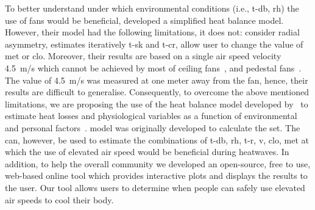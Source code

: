 To better understand under which environmental conditions (i.e., \ac{t-db}, \ac{rh}) the use of fans would be beneficial,  developed a simplified heat balance model.
However, their model had the following limitations, it does not: consider radial asymmetry, estimates iteratively \ac{t-sk} and \ac{t-cr}, allow user to change the value of \ac{met} or \ac{clo}.
Moreover, their results are based on a single air speed velocity 4.5~m/s which cannot be achieved by most of ceiling fans~\cite{Raftery2019}, and pedestal fans~\cite{Yang2015a}.
The value of 4.5~m/s was measured at one meter away from the fan, hence, their results are difficult to generalise.
Consequently, to overcome the above mentioned limitations, we are proposing the use of the heat balance model developed by~ to estimate heat losses and physiological variables as a function of environmental and personal factors~\cite{Gagge1986}.
 model was originally developed to calculate the \ac{set}.
The  can, however, be used to estimate the combinations of \ac{t-db}, \ac{rh}, \ac{t-r}, \ac{v}, \ac{clo}, \ac{met} at which the use of elevated air speed would be beneficial during heatwaves.
In addition, to help the overall community we developed an open-source, free to use, web-based online tool which provides interactive plots and displays the results to the user.
Our tool allows users to determine when people can safely use elevated air speeds to cool their body.

